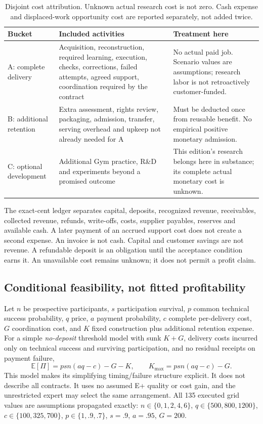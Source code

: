 \begin{table}[htbp]
\small
\begin{tabularx}{\textwidth}{lYY}
\toprule
Bucket & Included activities & Treatment here\\
\midrule
A: complete delivery & Acquisition, reconstruction, required learning, execution, checks, corrections, failed attempts, agreed support, coordination required by the contract & No actual paid job. Scenario values are assumptions; research labor is not retroactively customer-funded.\\
B: additional retention & Extra assessment, rights review, packaging, admission, transfer, serving overhead and upkeep not already needed for A & Must be deducted once from reusable benefit. No empirical positive monetary admission.\\
C: optional development & Additional Gym practice, R\&D and experiments beyond a promised outcome & This edition's research belongs here in substance; its complete actual monetary cost is unknown.\\
\bottomrule
\end{tabularx}
\caption{Disjoint cost attribution. Unknown actual research cost is not zero. Cash expense and displaced-work opportunity cost are reported separately, not added twice.}
\end{table}

The exact-cent ledger separates capital, deposits, recognized revenue, receivables, collected revenue, refunds, write-offs, costs, supplier payables, reserves and available cash. A later payment of an accrued support cost does not create a second expense. An invoice is not cash. Capital and customer savings are not revenue. A refundable deposit is an obligation until the acceptance condition earns it. An unavailable cost remains unknown; it does not permit a profit claim.

\subsection{Conditional feasibility, not fitted profitability}

Let $n$ be prospective participants, $s$ participation survival, $p$ common technical success probability, $q$ price, $a$ payment probability, $c$ complete per-delivery cost, $G$ coordination cost, and $K$ fixed construction plus additional retention expense. For a simple \emph{no-deposit} threshold model with sunk $K+G$, delivery costs incurred only on technical success and surviving participation, and no residual receipts on payment failure,
\begin{equation}
\mathbb{E}[\Pi]=psn(aq-c)-G-K,\qquad
K_{\max}=psn(aq-c)-G.
\end{equation}
This model makes its simplifying timing/failure structure explicit. It does not describe all contracts. It uses no assumed E+ quality or cost gain, and the unrestricted expert may select the same arrangement. All 135 executed grid values are assumptions propagated exactly: $n\in\{0,1,2,4,6\}$, $q\in\{500,800,1200\}$, $c\in\{100,325,700\}$, $p\in\{1,.9,.7\}$, $s=.9$, $a=.95$, $G=200$.

